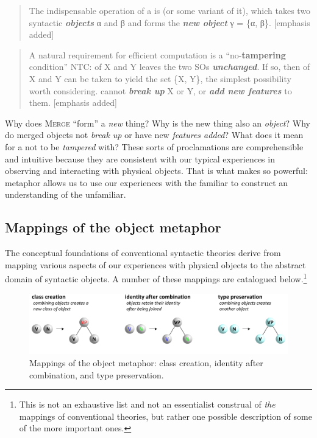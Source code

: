 \begin{quote}
The indispensable operation of a  is  (or some variant of it), which takes two syntactic \textbf{\textit{objects}} α and β and forms the \textbf{\textit{new object}} γ = \{α, β\}. \citep[3]{Chomsky2001hale} [emphasis added]
\end{quote}

\begin{quote}
A natural requirement for efficient computation is a “no-\textbf{tampering} condition” NTC:  of X and Y leaves the two SOs \textbf{\textit{unchanged}}. If so, then  of X and Y can be taken to yield the set \{X, Y\}, the simplest possibility worth considering.  cannot \textbf{\textit{break up}} X or Y, or \textbf{\textit{add new features}} to them. \citep[5-6]{Chomsky2008} [emphasis added]
\end{quote}

  Why does \textsc{Merge} “form” a \textit{new} thing? Why is the new thing also an \textit{object}? Why do merged objects not \textit{break up} or have new \textit{features added}? What does it mean for a  not to be \textit{tampered} with? These sorts of proclamations are comprehensible and  intuitive because they are consistent with our typical experiences in observing and interacting with physical objects. That is what makes  so powerful: metaphor allows us to use our experiences with the familiar to construct an understanding of the unfamiliar. 

\subsection{Mappings of the object metaphor}

The conceptual foundations of conventional syntactic theories derive from mapping various aspects of our experiences with physical objects to the abstract domain of syntactic objects. A number of these mappings are catalogued below.\footnote{This is not an exhaustive list and not an essentialist construal of \textit{the} mappings of conventional theories, but rather one possible description of some of the more important ones.}

  
\begin{figure}
\includegraphics[width=\textwidth]{figures/Tilsen-img29.png}
\caption{Mappings of the object metaphor: class creation, identity after combination, and type preservation.}
\label{fig:3:1}
\end{figure}
 
